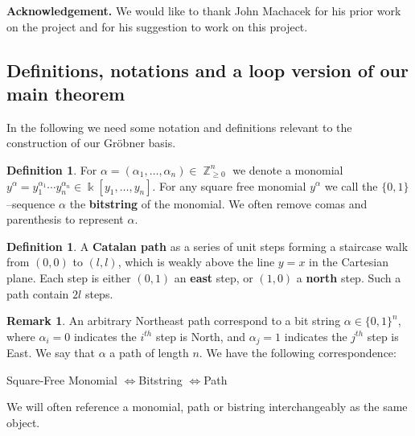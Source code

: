 \documentclass[12pt,reqno]{amsart}
\theoremstyle{plain}
\theoremstyle{definition}
\newtheorem{remark}[theorem]{Remark}
\newtheorem{definition}[theorem]{Definition}
\DeclareMathOperator{\Z}{\mathbb{Z}}
\def\field{\Bbbk}
\begin{document}
\medskip
\noindent
\textbf{Acknowledgement.} We would like to thank John Machacek for his prior work on the project and for his suggestion to work on this project. 


\subsection{ \label{background} Definitions, notations and a loop version of our main theorem}

In the following we need some notation and definitions relevant to the construction of our Gr\"obner basis.
\begin{definition}
	For $\alpha = (\alpha_1, \dots, \alpha_n) \in \Z_{\geq 0}^n$ we denote a monomial $y^\alpha = y_1^{\alpha_1} \cdots y_n^{\alpha_n}\in \field[y_1, \dots, y_n]$. 
	For any square free monomial $y^\alpha$ we call the $\{0,1\}$--sequence $\alpha$ the {\bf bitstring} of the monomial. We often remove comas and parenthesis to represent $\alpha$.
\end{definition}
\begin{definition} \label{catalan_path}
	A {\bf Catalan path} as a series of unit steps forming a staircase walk from $(0,0)$ to $(l,l)$, which is weakly above the line $y=x$ in the Cartesian plane. Each step is either $(0,1)$  an  {\bf east} step, or $(1,0)$ a {\bf north} step. Such a path contain $2l$ steps.
\end{definition}
\begin{remark}\label{rem:path}
	   An arbitrary Northeast path correspond to a bit string $\alpha \in \{0, 1 \}^n$, where $\alpha_i = 0$ indicates  the $i^{th}$ step is North, and $\alpha_j = 1$ indicates the $j^{th}$ step 
	   is East. We say that $\alpha$ a path of length $n$. We have the following correspondence:
	   \begin{center}
		Square-Free Monomial \quad$\iff$\quad Bitstring \quad$\iff$\quad Path
	   \end{center}
	   We will often reference a monomial, path or bistring interchangeably as the same object.
\end{remark}
\end{document}
